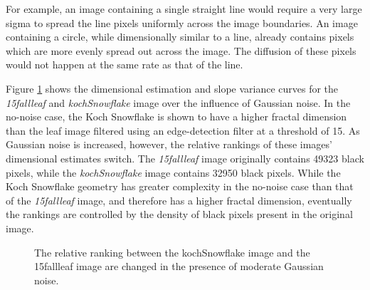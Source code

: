 \documentclass[12pt, oneside]{book}
\begin{document}
For example, an image containing a single straight line would require a very large sigma to spread the line pixels uniformly across the image boundaries.  An image containing a circle, while dimensionally similar to a line, already contains pixels which are more evenly spread out across the image.  The diffusion of these pixels would not happen at the same rate as that of the line.  

Figure \ref{fig:swapping_gaussian_multi_result} shows the dimensional estimation and slope variance curves for the \textit{15fallleaf} and \textit{kochSnowflake} image over the influence of Gaussian noise.  In the no-noise case, the Koch Snowflake is shown to have a higher fractal dimension than the leaf image filtered using an edge-detection filter at a threshold of 15.  As Gaussian noise is increased, however, the relative rankings of these images' dimensional estimates switch.  The \textit{15fallleaf} image originally contains 49323 black pixels, while the \textit{kochSnowflake} image contains 32950 black pixels.  While the Koch Snowflake geometry has greater complexity in the no-noise case than that of the \textit{15fallleaf} image, and therefore has a higher fractal dimension, eventually the rankings are controlled by the density of black pixels present in the original image.

\begin{figure}[!b]
  \centering
  \caption{The relative ranking between the kochSnowflake image and the 15fallleaf image are changed in the presence of moderate Gaussian noise.}
  \label{fig:swapping_gaussian_multi_result}
\end{figure}
\end{document}

